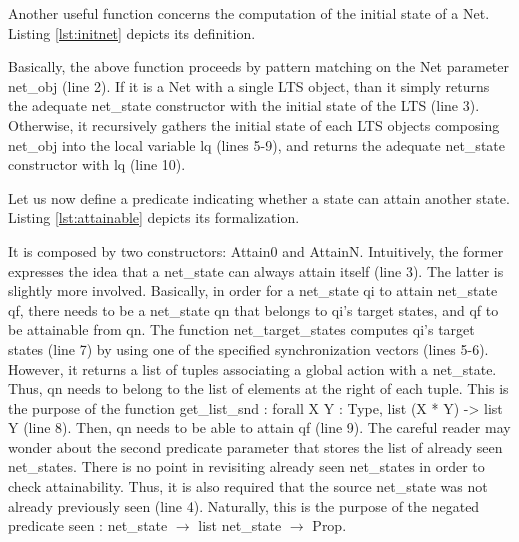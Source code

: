 		
		Another useful function concerns the computation of the initial state of a \textsf{Net}.
	Listing \ref{lst:initnet} depicts its definition.
	
			
	
	\noindent Basically, the above function proceeds by pattern matching on the \textsf{Net} parameter \textsf{net\_obj} (line 2). 
	If it is a \textsf{Net} with a single \textsf{LTS} object, than it simply returns the adequate \textsf{net\_state}
	constructor with the initial state of the \textsf{LTS} (line 3). Otherwise, it recursively
	gathers the initial state of each \textsf{LTS} objects composing \textsf{net\_obj} into
	the local variable \textsf{lq} (lines 5-9), and returns the adequate \textsf{net\_state}
	constructor with \textsf{lq} (line 10).
	

		Let us now define a predicate indicating whether a state can attain another state. Listing \ref{lst:attainable}
	depicts its formalization.
			
				
	
		
	\noindent It is composed by two constructors: \textsf{Attain0} and \textsf{AttainN}. Intuitively,
	the former expresses the idea that a \textsf{net\_state} can always attain itself (line 3).
	The latter is slightly more involved. Basically, in order for a \textsf{net\_state} \textsf{qi}
	to attain \textsf{net\_state} \textsf{qf}, there needs to be a \textsf{net\_state} \textsf{qn}
	that belongs to \textsf{qi}'s target states, and \textsf{qf} to be attainable from \textsf{qn}.
	The function \textsf{net\_target\_states} computes \textsf{qi}'s target states (line 7) by using
	one of the specified synchronization vectors (lines 5-6). 
	However, it returns a list of tuples associating a global \textsf{action} with a \textsf{net\_state}.
	Thus, \textsf{qn} needs to belong to the list of elements at the right of each tuple.	
	This is the purpose of the function 
	\textsf{get\_list\_snd : forall X Y : Type, list (X * Y) -> list Y}	(line 8). Then, 
	\textsf{qn} needs to be able to attain \textsf{qf} (line 9). The careful reader may wonder
	about the second predicate parameter that stores the list of already seen \textsf{net\_state}s. 
	There is no point in revisiting already seen \textsf{net\_state}s in order to check 
	attainability. Thus, it is also required that the source \textsf{net\_state} was not already
	previously seen (line 4). Naturally, this is the purpose of the negated predicate
	\textsf{seen : net\_state $\rightarrow$ list net\_state $\rightarrow$ Prop}.
	
